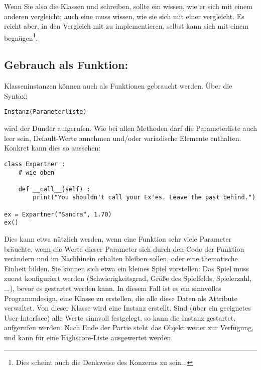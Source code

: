 Wenn Sie also die Klassen  und  schreiben, sollte ein  wissen, wie er sich mit einem anderen  vergleicht; auch eine  muss wissen, wie sie sich mit einer  vergleicht. Es reicht aber, in  den Vergleich mit  zu implementieren.  selbst kann sich mit einem  begnügen\footnote{Dies scheint auch die Denkweise des Konzerns zu sein...}.

\subsection{Gebrauch als Funktion: }
Klasseninstanzen können auch als Funktionen gebraucht werden. Über die Syntax:
\begin{codebox}
\begin{verbatim}
Instanz(Parameterliste)
\end{verbatim}
\end{codebox}

wird der Dunder  aufgerufen. Wie bei allen Methoden darf die Parameterliste auch leer sein, Default-Werte annehmen und/oder variadische Elemente enthalten. Konkret kann dies so aussehen:

\begin{codebox}
\begin{verbatim}
class Expartner :
    # wie oben
    
    def __call__(self) :
        print("You shouldn't call your Ex'es. Leave the past behind.")

ex = Expartner("Sandra", 1.70)
ex()
\end{verbatim}
\end{codebox}

Dies kann etwa nützlich werden, wenn eine Funktion sehr viele Parameter bräuchte, wenn die Werte dieser Parameter sich durch den Code der Funktion verändern und im Nachhinein erhalten bleiben sollen, oder eine thematische Einheit bilden. Sie können sich etwa ein kleines Spiel vorstellen: Das Spiel muss zuerst konfiguriert werden (Schwierigkeitsgrad, Größe des Spielfelds, Spielerzahl, ...), bevor es gestartet werden kann. In diesem Fall ist es ein sinnvolles Programmdesign, eine Klasse  zu erstellen, die alle diese Daten als Attribute verwaltet. Von dieser Klasse wird eine Instanz  erstellt. Sind (\eg über ein geeignetes User-Interface) alle Werte sinnvoll festgelegt, so kann die Instanz  gestartet, \ie aufgerufen werden. Nach Ende der Partie steht das Objekt  weiter zur Verfügung, und kann \eg für eine Highscore-Liste ausgewertet werden.

